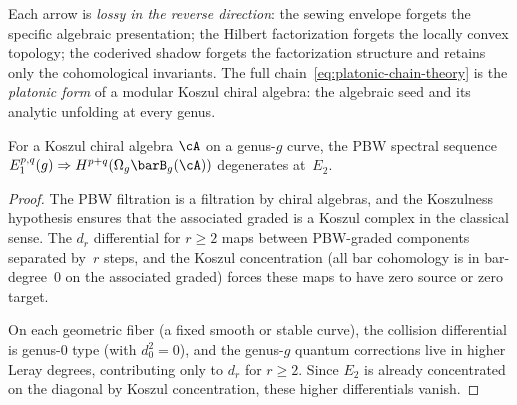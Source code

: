 \begin{remark}
Each arrow is \emph{lossy in the reverse direction}:
the sewing envelope forgets the specific
algebraic presentation; the Hilbert factorization
forgets the locally convex topology; the coderived
shadow forgets the factorization structure and retains
only the cohomological invariants.  The full
chain~\eqref{eq:platonic-chain-theory} is the
\emph{platonic form} of a modular Koszul chiral
algebra: the algebraic seed and its analytic unfolding
at every genus.
\end{remark}

\begin{lemma}\label{lem:e2-higher-genus}
\ClaimStatusProvedHere
For a Koszul chiral algebra $\cA$ on a genus-$g$ curve, the PBW
spectral sequence
$E_1^{p,q}(g) \Rightarrow H^{p+q}(\Omega_g \barB_g(\cA))$
degenerates at~$E_2$.
\end{lemma}

\begin{proof}
The PBW filtration is a filtration by chiral algebras, and the
Koszulness hypothesis ensures that the associated graded is a
Koszul complex in the classical sense.  The $d_r$ differential
for $r \geq 2$ maps between PBW-graded components separated
by~$r$ steps, and the Koszul concentration (all bar cohomology
is in bar-degree~$0$ on the associated graded) forces these maps
to have zero source or zero target.

On each geometric fiber (a fixed smooth or stable curve), the
collision differential is genus-$0$ type (with $d_0^2 = 0$), and
the genus-$g$ quantum corrections live in higher Leray degrees,
contributing only to $d_r$ for $r \geq 2$.  Since $E_2$ is
already concentrated on the diagonal by Koszul concentration,
these higher differentials vanish.
\end{proof}

